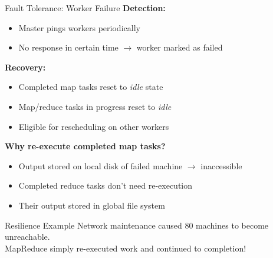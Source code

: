 \documentclass[aspectratio=169]{beamer}
\begin{document}
\begin{frame}{Fault Tolerance: Worker Failure}
\textbf{Detection:}
\begin{itemize}
    \item Master pings workers periodically
    \item No response in certain time $\rightarrow$ worker marked as failed
\end{itemize}

\vspace{0.3cm}

\textbf{Recovery:}
\begin{itemize}
    \item Completed map tasks reset to \textit{idle} state
    \item Map/reduce tasks in progress reset to \textit{idle}
    \item Eligible for rescheduling on other workers
\end{itemize}

\vspace{0.3cm}

\textbf{Why re-execute completed map tasks?}
\begin{itemize}
    \item Output stored on local disk of failed machine $\rightarrow$ \alert{inaccessible}
    \item Completed reduce tasks don't need re-execution
    \item Their output stored in global file system
\end{itemize}

\vspace{0.3cm}

\begin{exampleblock}{Resilience Example}
Network maintenance caused 80 machines to become unreachable. \\
MapReduce simply re-executed work and continued to completion!
\end{exampleblock}
\end{frame}
\end{document}
